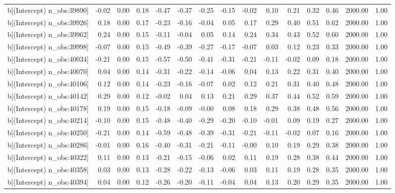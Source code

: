 \begin{table}[ht]
\begin{tabular}{rrrrrrrrrrrrrrr}
  b[(Intercept) n\_obs:39890] & -0.02 & 0.00 & 0.18 & -0.47 & -0.37 & -0.25 & -0.15 & -0.02 & 0.10 & 0.21 & 0.32 & 0.46 & 2000.00 & 1.00 \\ 
  b[(Intercept) n\_obs:39926] & 0.18 & 0.00 & 0.17 & -0.23 & -0.16 & -0.04 & 0.05 & 0.17 & 0.29 & 0.40 & 0.51 & 0.62 & 2000.00 & 1.00 \\ 
  b[(Intercept) n\_obs:39962] & 0.24 & 0.00 & 0.15 & -0.11 & -0.04 & 0.05 & 0.14 & 0.24 & 0.34 & 0.43 & 0.52 & 0.60 & 2000.00 & 1.00 \\ 
  b[(Intercept) n\_obs:39998] & -0.07 & 0.00 & 0.15 & -0.49 & -0.39 & -0.27 & -0.17 & -0.07 & 0.03 & 0.12 & 0.23 & 0.33 & 2000.00 & 1.00 \\ 
  b[(Intercept) n\_obs:40034] & -0.21 & 0.00 & 0.15 & -0.57 & -0.50 & -0.41 & -0.31 & -0.21 & -0.11 & -0.02 & 0.09 & 0.18 & 2000.00 & 1.00 \\ 
  b[(Intercept) n\_obs:40070] & 0.04 & 0.00 & 0.14 & -0.31 & -0.22 & -0.14 & -0.06 & 0.04 & 0.13 & 0.22 & 0.31 & 0.40 & 2000.00 & 1.00 \\ 
  b[(Intercept) n\_obs:40106] & 0.12 & 0.00 & 0.14 & -0.23 & -0.16 & -0.07 & 0.02 & 0.12 & 0.21 & 0.31 & 0.40 & 0.48 & 2000.00 & 1.00 \\ 
  b[(Intercept) n\_obs:40142] & 0.29 & 0.00 & 0.12 & -0.02 & 0.04 & 0.13 & 0.21 & 0.29 & 0.37 & 0.44 & 0.52 & 0.59 & 2000.00 & 1.00 \\ 
  b[(Intercept) n\_obs:40178] & 0.19 & 0.00 & 0.15 & -0.18 & -0.09 & -0.00 & 0.08 & 0.18 & 0.29 & 0.38 & 0.48 & 0.56 & 2000.00 & 1.00 \\ 
  b[(Intercept) n\_obs:40214] & -0.10 & 0.00 & 0.15 & -0.48 & -0.40 & -0.29 & -0.20 & -0.10 & -0.01 & 0.09 & 0.19 & 0.27 & 2000.00 & 1.00 \\ 
  b[(Intercept) n\_obs:40250] & -0.21 & 0.00 & 0.14 & -0.59 & -0.48 & -0.39 & -0.31 & -0.21 & -0.11 & -0.02 & 0.07 & 0.16 & 2000.00 & 1.00 \\ 
  b[(Intercept) n\_obs:40286] & -0.01 & 0.00 & 0.16 & -0.40 & -0.31 & -0.21 & -0.11 & -0.00 & 0.10 & 0.19 & 0.29 & 0.38 & 2000.00 & 1.00 \\ 
  b[(Intercept) n\_obs:40322] & 0.11 & 0.00 & 0.13 & -0.21 & -0.15 & -0.06 & 0.02 & 0.11 & 0.19 & 0.28 & 0.38 & 0.44 & 2000.00 & 1.00 \\ 
  b[(Intercept) n\_obs:40358] & 0.03 & 0.00 & 0.13 & -0.28 & -0.22 & -0.13 & -0.06 & 0.03 & 0.11 & 0.19 & 0.28 & 0.35 & 2000.00 & 1.00 \\ 
  b[(Intercept) n\_obs:40394] & 0.04 & 0.00 & 0.12 & -0.26 & -0.20 & -0.11 & -0.04 & 0.04 & 0.13 & 0.20 & 0.29 & 0.35 & 2000.00 & 1.00 \\ 

\end{tabular}
\end{table}
